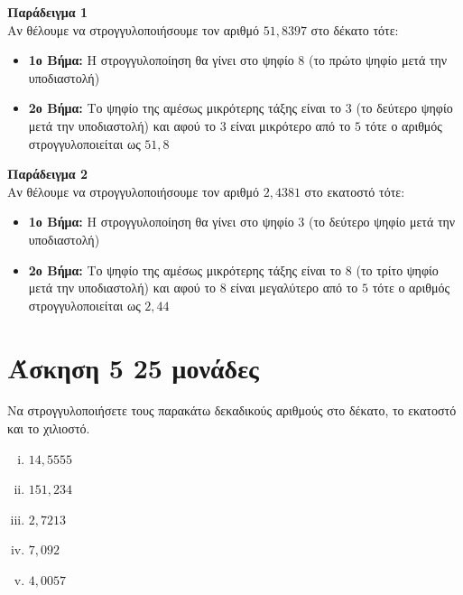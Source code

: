 \documentclass[a4paper,10pt]{report}
\begin{document}
\textbf{Παράδειγμα 1}\\
Αν θέλουμε να στρογγυλοποιήσουμε τον αριθμό $51,8397$ στο δέκατο τότε:
\begin{itemize}
 \item \textbf{1ο Βήμα:} Η στρογγυλοποίηση θα γίνει στο ψηφίο $8$ (το πρώτο ψηφίο μετά την υποδιαστολή)
 \item \textbf{2ο Βήμα:} Το ψηφίο της αμέσως μικρότερης τάξης είναι το $3$ (το δεύτερο ψηφίο μετά την υποδιαστολή) 
       και αφού το $3$ είναι μικρότερο από το $5$ τότε ο αριθμός στρογγυλοποιείται ως $51,8$
\end{itemize}

\textbf{Παράδειγμα 2}\\
Αν θέλουμε να στρογγυλοποιήσουμε τον αριθμό $2,4381$ στο εκατοστό τότε:
\begin{itemize}
 \item \textbf{1ο Βήμα:} Η στρογγυλοποίηση θα γίνει στο ψηφίο $3$ (το δεύτερο ψηφίο μετά την υποδιαστολή)
 \item \textbf{2ο Βήμα:} Το ψηφίο της αμέσως μικρότερης τάξης είναι το $8$ (το τρίτο ψηφίο μετά την υποδιαστολή) 
       και αφού το $8$ είναι μεγαλύτερο από το $5$ τότε ο αριθμός στρογγυλοποιείται ως $2,44$
\end{itemize}


\section*{Άσκηση 5  \hfill \small{25 μονάδες}}
Να στρογγυλοποιήσετε τους παρακάτω δεκαδικούς αριθμούς στο δέκατο, το εκατοστό και το χιλιοστό.
\begin{enumerate}[i)]
 \item $14,5555$
 \item $151,234$
 \item $2,7213$
 \item $7,092$
 \item $4,0057$
\end{enumerate}
\end{document}
